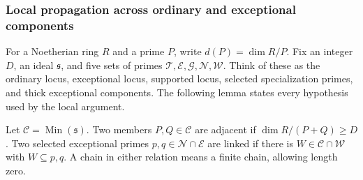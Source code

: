 \subsubsection{Local propagation across ordinary and exceptional components}
For a Noetherian ring $R$ and a prime $P$, write
$d(P)=\dim R/P$. Fix an integer $D$, an ideal $\mathfrak s$, and five
sets of primes $\mathcal T,\mathcal E,\mathcal G,\mathcal N,\mathcal W$.
Think of these as the ordinary locus, exceptional locus, supported
locus, selected specialization primes, and thick exceptional components.
The following lemma states every hypothesis used by the local argument.

Let $\mathcal C=\operatorname{Min}(\mathfrak s)$.
Two members $P,Q\in\mathcal C$ are adjacent if
$\dim R/(P+Q)\ge D$.
Two selected exceptional primes $p,q\in\mathcal N\cap\mathcal E$ are
linked if there is $W\in\mathcal C\cap\mathcal W$ with $W\subseteq p,q$.
A chain in either relation means a finite chain, allowing length zero.


